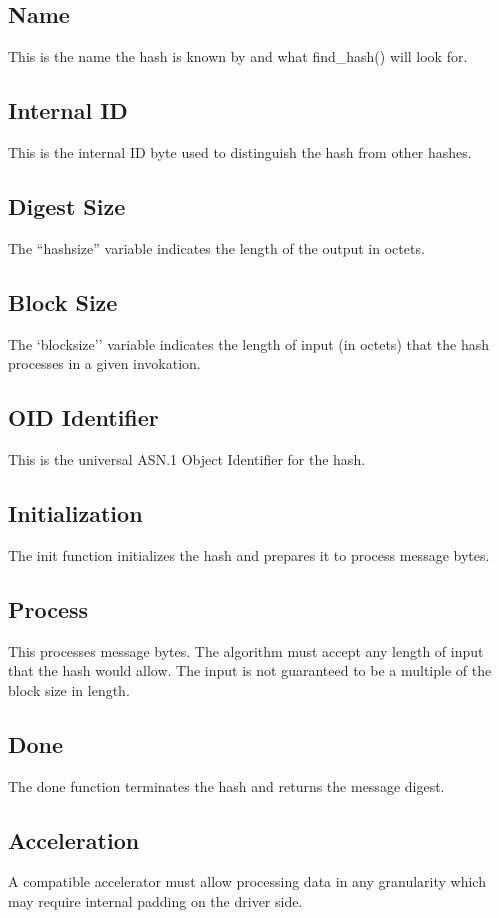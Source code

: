 \documentclass[a4paper]{book}
\begin{document}
\subsection{Name}
This is the name the hash is known by and what find\_hash() will look for.

\subsection{Internal ID}
This is the internal ID byte used to distinguish the hash from other hashes.

\subsection{Digest Size}
The ``hashsize'' variable indicates the length of the output in octets.

\subsection{Block Size}
The `blocksize'' variable indicates the length of input (in octets) that the hash processes in a given
invokation.

\subsection{OID Identifier}
This is the universal ASN.1 Object Identifier for the hash.

\subsection{Initialization}
The init function initializes the hash and prepares it to process message bytes.

\subsection{Process}
This processes message bytes.  The algorithm must accept any length of input that the hash would allow.  The input is not
guaranteed to be a multiple of the block size in length.

\subsection{Done}
The done function terminates the hash and returns the message digest.

\subsection{Acceleration}
A compatible accelerator must allow processing data in any granularity which may require internal padding on the driver side.  
\end{document}
